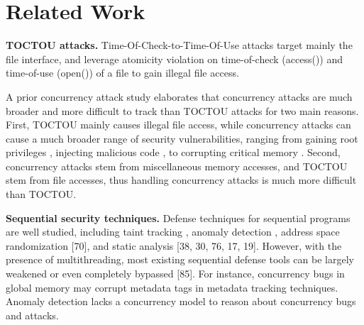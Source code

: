 \section{Related Work} \label{sec:related}


\textbf{TOCTOU attacks.} Time-Of-Check-to-Time-Of-Use attacks \cite{bishop1996checking,tsyrklevich2003dynamic, tsafrir2008portably,wei2005tocttou}
target mainly the file interface, and
leverage atomicity violation on time-of-check (access())
and time-of-use (open()) of a file to gain illegal file access.

A prior concurrency attack study \cite{yang2016concurrency} elaborates that concurrency
attacks are much broader and more difficult to track
than TOCTOU attacks for two main reasons. First, TOCTOU
mainly causes illegal file access, while concurrency attacks
can cause a much broader range of security vulnerabilities,
ranging from gaining root privileges \cite{uselib-bug-12791} , injecting malicious
code \cite{freebsdcve}, to corrupting critical memory \cite{apache-bug-25520}. Second, concurrency
attacks stem from miscellaneous memory accesses, and
TOCTOU stem from file accesses, thus handling concurrency
attacks is much more difficult than TOCTOU.

\noindent
\textbf{Sequential security techniques.} Defense techniques for sequential
programs are well studied, including taint tracking \cite{taintdroid:osdi10,lift:micro06,sospinfomationflowcontrol,valgrind:pldi}, 
anomaly detection \cite{taskrecycling:ppopp90,schonberg:pldi89}, address space
randomization [70], and static analysis [38, 30, 76, 17, 19].
However, with the presence of multithreading, most existing
sequential defense tools can be largely weakened or even
completely bypassed [85]. For instance, concurrency bugs
in global memory may corrupt metadata tags in metadata
tracking techniques. Anomaly detection lacks a concurrency
model to reason about concurrency bugs and attacks.

